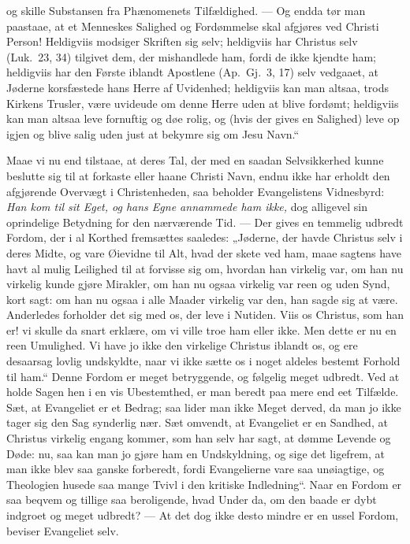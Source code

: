 \documentclass[12pt,a4paper]{book}
\begin{document}
og skille Substansen fra Phænomenets Tilfældighed. --- Og endda tør man paastaae,
at et Menneskes Salighed og Fordømmelse skal afgjøres ved Christi Person!
Heldigviis modsiger Skriften sig selv; heldigviis har Christus selv (Luk.\ 23,
34) tilgivet dem, der mishandlede ham, fordi de ikke kjendte ham; heldigviis har
den Første iblandt Apostlene (Ap.\ Gj.\ 3, 17) selv vedgaaet, at Jøderne
korsfæstede hans Herre af Uvidenhed; heldigviis kan man altsaa, trods Kirkens
Trusler, være uvideude om denne Herre uden at blive fordømt; heldigviis kan man
altsaa leve fornuftig og døe rolig, og (hvis der gives en Salighed) leve op igjen
og blive salig uden just at bekymre sig om Jesu Navn.“

Maae vi nu end tilstaae, at deres Tal, der med en saadan
Selvsikkerhed kunne beslutte sig til at forkaste eller haane Christi Navn, endnu
ikke har erholdt den afgjørende Overvægt i Christenheden, saa beholder
Evangelistens Vidnesbyrd: \emph{Han kom til sit Eget, og hans Egne annammede ham
ikke,} dog alligevel sin oprindelige Betydning for den nærværende Tid. --- Der
gives en temmelig udbredt Fordom, der i al Korthed fremsættes saaledes: „Jøderne,
der havde Christus selv i deres Midte, og vare Øievidne til Alt, hvad der skete
ved ham, maae sagtens have havt al mulig Leilighed til at forvisse sig om,
hvordan han virkelig var, om han nu virkelig kunde gjøre Mirakler, om han nu
ogsaa virkelig var reen og uden Synd, kort sagt: om han nu ogsaa i alle Maader
virkelig var den, han sagde sig at være. Anderledes forholder det sig med os, der
leve i Nutiden. Viis os Christus, som han er! vi skulle da snart erklære, om vi
ville troe ham eller ikke. Men dette er nu en reen Umulighed. Vi have jo ikke den
virkelige Christus iblandt os, og ere desaarsag lovlig undskyldte, naar vi ikke
sætte os i noget aldeles bestemt Forhold til ham.“ Denne Fordom er meget
betryggende, og følgelig meget udbredt. Ved at holde Sagen hen i en vis
Ubestemthed, er man beredt paa mere end eet Tilfælde. Sæt, at Evangeliet er et
Bedrag; saa lider man ikke Meget derved, da man jo ikke tager sig den Sag
synderlig nær. Sæt omvendt, at Evangeliet er en Sandhed, at Christus virkelig
engang kommer, som han selv har sagt, at dømme Levende og Døde: nu, saa kan man
jo gjøre ham en Undskyldning, og sige det ligefrem, at man ikke blev saa ganske
forberedt, fordi Evangelierne vare saa unøiagtige, og Theologien husede saa mange
Tvivl i den kritiske Indledning“. Naar en Fordom er saa beqvem og tillige saa
beroligende, hvad Under da, om den baade er dybt indgroet og meget udbredt? ---
At det dog ikke desto mindre er en ussel Fordom, beviser Evangeliet selv.
\end{document}

